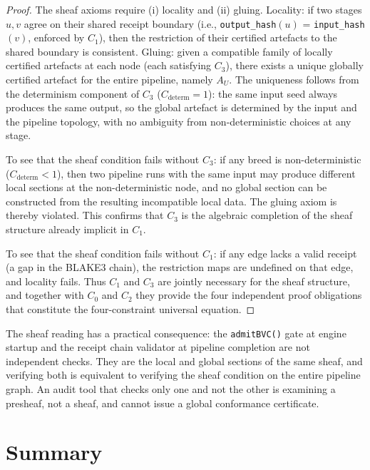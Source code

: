\begin{proof}
The sheaf axioms require (i) locality and (ii) gluing. Locality: if two stages $u, v$
agree on their shared receipt boundary (i.e., \texttt{output\_hash}$(u)$ =
\texttt{input\_hash}$(v)$, enforced by $C_1$), then the restriction of their
certified artefacts to the shared boundary is consistent. Gluing: given a compatible
family of locally certified artefacts at each node (each satisfying $C_3$), there
exists a unique globally certified artefact for the entire pipeline, namely $A_U$.
The uniqueness follows from the determinism component of $C_3$
($C_{\mathrm{determ}} = 1$): the same input seed always produces the same output,
so the global artefact is determined by the input and the pipeline topology, with no
ambiguity from non-deterministic choices at any stage.

To see that the sheaf condition fails without $C_3$: if any breed is non-deterministic
($C_{\mathrm{determ}} < 1$), then two pipeline runs with the same input may produce
different local sections at the non-deterministic node, and no global section can be
constructed from the resulting incompatible local data. The gluing axiom is thereby
violated. This confirms that $C_3$ is the algebraic completion of the sheaf structure
already implicit in $C_1$.

To see that the sheaf condition fails without $C_1$: if any edge lacks a valid receipt
(a gap in the BLAKE3 chain), the restriction maps are undefined on that edge, and
locality fails. Thus $C_1$ and $C_3$ are jointly necessary for the sheaf structure,
and together with $C_0$ and $C_2$ they provide the four independent proof obligations
that constitute the four-constraint universal equation.
\end{proof}

The sheaf reading has a practical consequence: the \texttt{admitBVC()} gate at engine
startup and the receipt chain validator at pipeline completion are not independent
checks. They are the local and global sections of the same sheaf, and verifying both
is equivalent to verifying the sheaf condition on the entire pipeline graph. An
audit tool that checks only one and not the other is examining a presheaf, not a
sheaf, and cannot issue a global conformance certificate.

\section{Summary}
\label{sec:fourth-constraint-summary}

